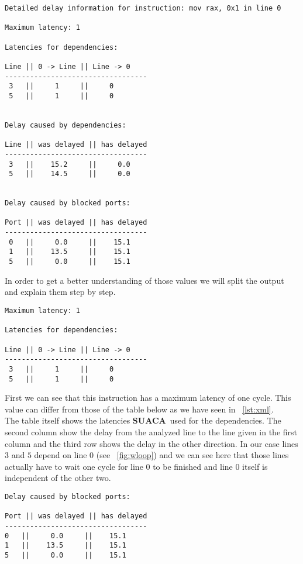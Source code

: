\documentclass[a4paper,12pt,titlepage, twoside]{report}
\newcommand{\suaca}{\textbf{SUACA}}
\begin{document}
\begin{Verbatim}[fontsize=\scriptsize]
Detailed delay information for instruction: mov rax, 0x1 in line 0

Maximum latency: 1

Latencies for dependencies:

Line || 0 -> Line || Line -> 0
----------------------------------
 3   ||     1     ||     0
 5   ||     1     ||     0


Delay caused by dependencies:

Line || was delayed || has delayed
----------------------------------
 3   ||    15.2     ||     0.0
 5   ||    14.5     ||     0.0


Delay caused by blocked ports:

Port || was delayed || has delayed
----------------------------------
 0   ||     0.0     ||    15.1
 1   ||    13.5     ||    15.1
 5   ||     0.0     ||    15.1
\end{Verbatim}

In order to get a better understanding of those values we will split the output and explain them step by step.

\begin{Verbatim}[fontsize=\scriptsize]
Maximum latency: 1

Latencies for dependencies:

Line || 0 -> Line || Line -> 0
----------------------------------
 3   ||     1     ||     0
 5   ||     1     ||     0
\end{Verbatim}

First we can see that this instruction has a maximum latency of one cycle. This value can differ from those of the table below as we have seen in ~\autoref{lst:xml}.\\
The table itself shows the latencies \suaca\ used for the dependencies. The second column show the delay from the analyzed line to the line given in the first column and the third row shows the delay in the other direction. In our case lines $3$ and $5$ depend on line $0$ (see ~\autoref{fig:wloop}) and we can see here that those lines actually have to wait one cycle for line $0$ to be finished and line $0$ itself is independent of the other two.\\


\begin{Verbatim}[fontsize=\scriptsize]
Delay caused by blocked ports:

Port || was delayed || has delayed
----------------------------------
0   ||     0.0     ||    15.1
1   ||    13.5     ||    15.1
5   ||     0.0     ||    15.1
\end{Verbatim}
\end{document}
